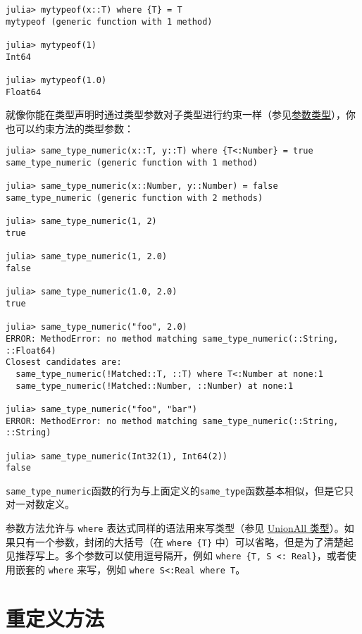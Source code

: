 \begin{verbatim}
julia> mytypeof(x::T) where {T} = T
mytypeof (generic function with 1 method)

julia> mytypeof(1)
Int64

julia> mytypeof(1.0)
Float64
\end{verbatim}



就像你能在类型声明时通过类型参数对子类型进行约束一样（参见\href{@ref}{参数类型}），你也可以约束方法的类型参数：




\begin{verbatim}
julia> same_type_numeric(x::T, y::T) where {T<:Number} = true
same_type_numeric (generic function with 1 method)

julia> same_type_numeric(x::Number, y::Number) = false
same_type_numeric (generic function with 2 methods)

julia> same_type_numeric(1, 2)
true

julia> same_type_numeric(1, 2.0)
false

julia> same_type_numeric(1.0, 2.0)
true

julia> same_type_numeric("foo", 2.0)
ERROR: MethodError: no method matching same_type_numeric(::String, ::Float64)
Closest candidates are:
  same_type_numeric(!Matched::T, ::T) where T<:Number at none:1
  same_type_numeric(!Matched::Number, ::Number) at none:1

julia> same_type_numeric("foo", "bar")
ERROR: MethodError: no method matching same_type_numeric(::String, ::String)

julia> same_type_numeric(Int32(1), Int64(2))
false
\end{verbatim}



\texttt{same\_type\_numeric}函数的行为与上面定义的\texttt{same\_type}函数基本相似，但是它只对一对数定义。



参数方法允许与 \texttt{where} 表达式同样的语法用来写类型（参见 \hyperlink{11072845175692859046}{UnionAll 类型}）。如果只有一个参数，封闭的大括号（在 \texttt{where \{T\}} 中）可以省略，但是为了清楚起见推荐写上。多个参数可以使用逗号隔开，例如 \texttt{where \{T, S <: Real\}}，或者使用嵌套的 \texttt{where} 来写，例如 \texttt{where S<:Real where T}。



\hypertarget{18141577506112006209}{}


\section{重定义方法}



